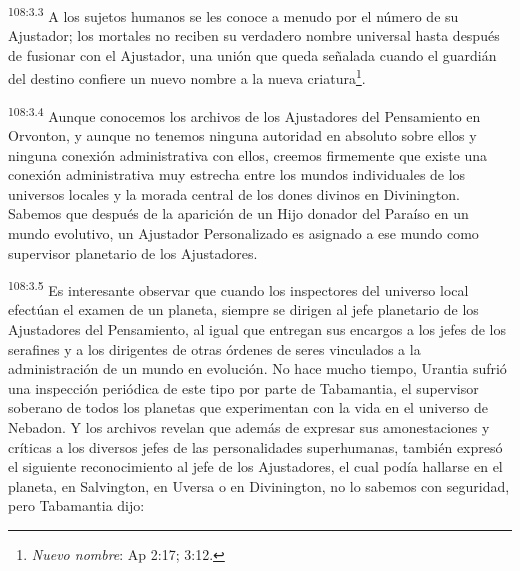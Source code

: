 \documentclass[twoside, 11pt]{book}
\begin{document}
\par
\textsuperscript{108:3.3} A los sujetos humanos se les conoce a menudo por el número de su Ajustador; los mortales no reciben su verdadero nombre universal hasta después de fusionar con el Ajustador, una unión que queda señalada cuando el guardián del destino confiere un nuevo nombre a la nueva criatura\footnote{\textit{Nuevo nombre}: Ap 2:17; 3:12.}.

\par
\textsuperscript{108:3.4} Aunque conocemos los archivos de los Ajustadores del Pensamiento en Orvonton, y aunque no tenemos ninguna autoridad en absoluto sobre ellos y ninguna conexión administrativa con ellos, creemos firmemente que existe una conexión administrativa muy estrecha entre los mundos individuales de los universos locales y la morada central de los dones divinos en Divinington. Sabemos que después de la aparición de un Hijo donador del Paraíso en un mundo evolutivo, un Ajustador Personalizado es asignado a ese mundo como supervisor planetario de los Ajustadores.

\par
\textsuperscript{108:3.5} Es interesante observar que cuando los inspectores del universo local efectúan el examen de un planeta, siempre se dirigen al jefe planetario de los Ajustadores del Pensamiento, al igual que entregan sus encargos a los jefes de los serafines y a los dirigentes de otras órdenes de seres vinculados a la administración de un mundo en evolución. No hace mucho tiempo, Urantia sufrió una inspección periódica de este tipo por parte de Tabamantia, el supervisor soberano de todos los planetas que experimentan con la vida en el universo de Nebadon. Y los archivos revelan que además de expresar sus amonestaciones y críticas a los diversos jefes de las personalidades superhumanas, también expresó el siguiente reconocimiento al jefe de los Ajustadores, el cual podía hallarse en el planeta, en Salvington, en Uversa o en Divinington, no lo sabemos con seguridad, pero Tabamantia dijo:
\end{document}
